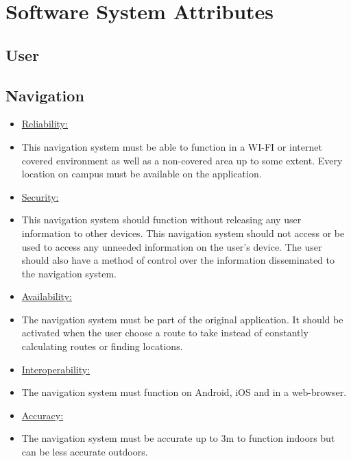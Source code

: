 \documentclass[runningheads,a4paper]{article}
\begin{document}
\section{Software System Attributes}

\subsection{User}
\subsection{Navigation}
\begin{itemize}
\item \underline{Reliability:} 
\item This navigation system must be able to function in a WI-FI or internet covered environment as well as a non-covered area up to some extent. Every location on campus must be available on the application. 

\item \underline{Security:}
\item This navigation system should function without releasing any user information to other devices. This navigation system should not access or be used to access any unneeded information on the user’s device. 
The user should also have a method of control over the information disseminated to the navigation system.

\item \underline{Availability:}
\item The navigation system must be part of the original application. It should be activated when the user choose a route to take instead of constantly calculating routes or finding locations. 

\item \underline{Interoperability:}
\item The navigation system must function on Android, iOS and in a web-browser.

\item \underline{Accuracy:}
\item The navigation system must be accurate up to 3m to function indoors but can be less accurate outdoors. 
\end{itemize}
\end{document}
